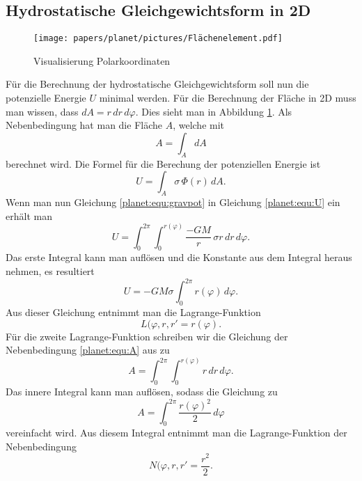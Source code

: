 \subsection{Hydrostatische Gleichgewichtsform in 2D}
\begin{figure}
	\centering
	\texttt{[image: papers/planet/pictures/Flächenelement.pdf]}
	\caption{Visualisierung Polarkoordinaten}
	\label{planet:fig:2d}
\end{figure}
Für die Berechnung der hydrostatische Gleichgewichtsform soll nun die potenzielle Energie \(U\) minimal werden.
Für die Berechnung der Fläche in 2D muss man wissen, dass \(dA = r \, dr \, d\varphi\).
Dies sieht man in Abbildung \ref{planet:fig:2d}.
Als Nebenbedingung hat man die Fläche \(A\), welche mit 
\begin{equation}
	A = \int_{A}^{} dA
	\label{planet:equ:A}
\end{equation}
berechnet wird.
Die Formel für die Berechung der potenziellen Energie ist
\begin{equation}
	U = \int_{A} \sigma \, \Phi (r) \, dA.
	\label{planet:equ:U}
\end{equation}
Wenn man nun Gleichung \eqref{planet:equ:gravpot} in Gleichung \eqref{planet:equ:U} ein erhält man
\begin{equation*}
	U = \int_{0}^{2\pi}\int_{0}^{r(\varphi)} \frac{-GM}{r} \, \sigma r \, dr \, d\varphi.
\end{equation*}
Das erste Integral kann man auflösen und die Konstante aus dem Integral heraus nehmen, es resultiert 
\begin{equation}
	U =-GM\sigma \int_{0}^{2\pi} r(\varphi) \, d\varphi .
\end{equation}
Aus dieser Gleichung entnimmt man die Lagrange-Funktion
\begin{equation}
	L(\varphi ,r,r' = r(\varphi).
\end{equation}
Für die zweite Lagrange-Funktion schreiben wir die Gleichung der Nebenbedingung \eqref{planet:equ:A} aus zu
\begin{equation*}
	A = \int_{0}^{2\pi}\int_{0}^{r(\varphi)} r \, dr \, d\varphi.
\end{equation*}
Das innere Integral kann man auflösen, sodass die Gleichung zu
\begin{equation*}
	A = \int_{0}^{2\pi}\frac{r(\varphi)^2}{2} \, d\varphi
\end{equation*}
vereinfacht wird.
Aus diesem Integral entnimmt man die Lagrange-Funktion der Nebenbedingung
\begin{equation*}
	N(\varphi ,r,r' = \frac{r^2}{2}.
\end{equation*}

